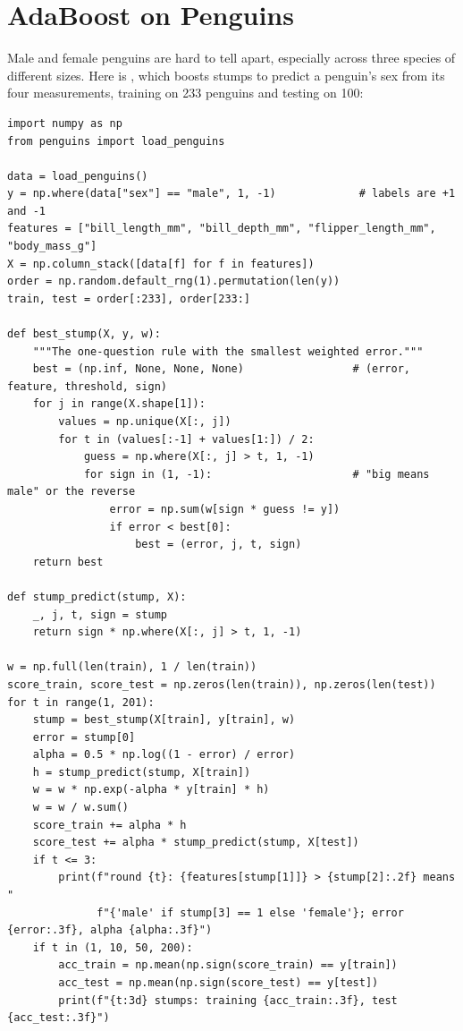 \section{AdaBoost on Penguins}
Male and female penguins are hard to tell apart, especially across three species of different sizes. Here is
, which boosts stumps to predict a penguin's sex from its four measurements, training on
233 penguins and testing on 100:

\begin{verbatim}
import numpy as np
from penguins import load_penguins

data = load_penguins()
y = np.where(data["sex"] == "male", 1, -1)             # labels are +1 and -1
features = ["bill_length_mm", "bill_depth_mm", "flipper_length_mm", "body_mass_g"]
X = np.column_stack([data[f] for f in features])
order = np.random.default_rng(1).permutation(len(y))
train, test = order[:233], order[233:]

def best_stump(X, y, w):
    """The one-question rule with the smallest weighted error."""
    best = (np.inf, None, None, None)                 # (error, feature, threshold, sign)
    for j in range(X.shape[1]):
        values = np.unique(X[:, j])
        for t in (values[:-1] + values[1:]) / 2:
            guess = np.where(X[:, j] > t, 1, -1)
            for sign in (1, -1):                      # "big means male" or the reverse
                error = np.sum(w[sign * guess != y])
                if error < best[0]:
                    best = (error, j, t, sign)
    return best

def stump_predict(stump, X):
    _, j, t, sign = stump
    return sign * np.where(X[:, j] > t, 1, -1)

w = np.full(len(train), 1 / len(train))
score_train, score_test = np.zeros(len(train)), np.zeros(len(test))
for t in range(1, 201):
    stump = best_stump(X[train], y[train], w)
    error = stump[0]
    alpha = 0.5 * np.log((1 - error) / error)
    h = stump_predict(stump, X[train])
    w = w * np.exp(-alpha * y[train] * h)
    w = w / w.sum()
    score_train += alpha * h
    score_test += alpha * stump_predict(stump, X[test])
    if t <= 3:
        print(f"round {t}: {features[stump[1]]} > {stump[2]:.2f} means "
              f"{'male' if stump[3] == 1 else 'female'}; error {error:.3f}, alpha {alpha:.3f}")
    if t in (1, 10, 50, 200):
        acc_train = np.mean(np.sign(score_train) == y[train])
        acc_test = np.mean(np.sign(score_test) == y[test])
        print(f"{t:3d} stumps: training {acc_train:.3f}, test {acc_test:.3f}")
\end{verbatim}

